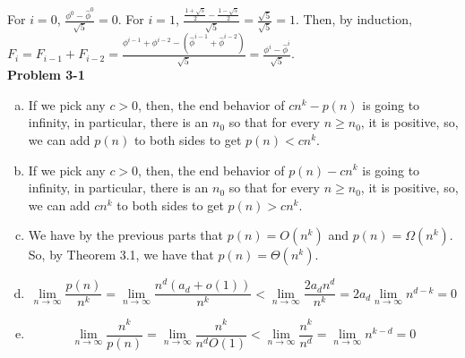 \documentclass{article}
\begin{document}
For $i=0$, $\frac{\phi^0 - \hat\phi^0}{\sqrt{5}} = 0$. For $i=1$, $\frac{\frac{1+\sqrt{5}}{2} - \frac{1-\sqrt{5}}{2}}{\sqrt{5}} = \frac{\sqrt{5}}{\sqrt{5}} = 1$. Then, by induction, $F_i = F_{i-1}+F_{i-2} = \frac{\phi^{i-1}+\phi^{i-2} - (\hat\phi^{i-1} +\hat\phi^{i-2})}{\sqrt{5}} = \frac{\phi^i - \hat\phi^i}{\sqrt{5}}$.\\

\noindent\textbf{Problem 3-1}\\

\begin{enumerate}[a)]
\item
If we pick any $c>0$, then, the end behavior of $cn^k -p(n)$ is going to infinity, in particular, there is an $n_0$ so that for every $n\ge n_0$, it is positive, so, we can add $p(n)$ to both sides to get $p(n)<cn^k$.

\item
If we pick any $c>0$, then, the end behavior of $p(n)- cn^k$ is going to infinity, in particular, there is an $n_0$ so that for every $n\ge n_0$, it is positive, so, we can add $cn^k$ to both sides to get $p(n)>cn^k$.

\item
We have by the previous parts that $p(n) = O(n^k)$ and $p(n)= \Omega(n^k)$. So, by Theorem 3.1, we have that $p(n) = \Theta(n^k)$.

\item
\[
\lim_{n\rightarrow\infty} \frac{p(n)}{n^k} = \lim_{n\rightarrow\infty} \frac{n^d(a_d + o(1))}{n^k} < \lim_{n\rightarrow\infty} \frac{2a_dn^d}{n^k} = 2a_d\lim_{n\rightarrow\infty} n^{d-k} = 0
\]


\item
\[
\lim_{n\rightarrow\infty} \frac{n^k}{p(n)} = \lim_{n\rightarrow\infty} \frac{n^k}{n^d O(1)} < \lim_{n\rightarrow\infty} \frac{n^k}{n^d} = \lim_{n\rightarrow\infty} n^{k-d} = 0
\]

\end{enumerate}
\end{document}
